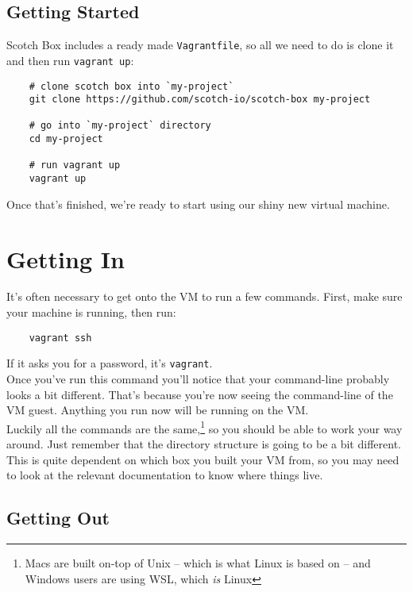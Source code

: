 \subsection{Getting Started}

Scotch Box includes a ready made \texttt{Vagrantfile}, so all we need to do is clone it and then run \texttt{vagrant up}:

\begin{verbatim}
    # clone scotch box into `my-project`
    git clone https://github.com/scotch-io/scotch-box my-project

    # go into `my-project` directory
    cd my-project

    # run vagrant up
    vagrant up
\end{verbatim}

Once that's finished, we're ready to start using our shiny new virtual machine.


\section{Getting In}

It's often necessary to get onto the VM to run a few commands. First, make sure your machine is running, then run:

\begin{verbatim}
    vagrant ssh
\end{verbatim}

If it asks you for a password, it's \texttt{vagrant}.
\\

Once you've run this command you'll notice that your command-line probably looks a bit different. That's because you're now seeing the command-line of the VM guest. Anything you run now will be running on the VM.
\\

Luckily all the commands are the same,\footnote{Macs are built on-top of Unix – which is what Linux is based on – and Windows users are using WSL, which \textit{is} Linux} so you should be able to work your way around. Just remember that the directory structure is going to be a bit different. This is quite dependent on which box you built your VM from, so you may need to look at the relevant documentation to know where things live.

\subsection{Getting Out}

